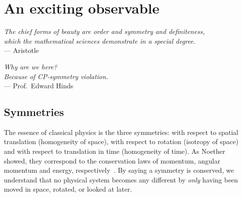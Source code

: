 \chapter{An exciting observable}
\label{ch:nedm-at-psi}




\begin{flushright}{\slshape    
  The chief forms of beauty are order and symmetry and definiteness,\\
  which the mathematical sciences demonstrate in a special degree.} \\ \medskip
--- Aristotle
\end{flushright}

\bigskip

\begin{flushright}{\slshape    
  Why are we here?\\
  Because of CP-symmetry violation.} \\ \medskip
--- Prof.\ Edward Hinds
\end{flushright}

\bigskip

\section{Symmetries}


The essence of classical physics is the three symmetries: with respect to spatial translation (homogeneity of space), with respect to rotation (isotropy of space) and with respect to translation in time (homogeneity of time). As Noether showed, they correspond to the conservation laws of momentum, angular momentum and energy, respectively~\cite{Noether1918}. By saying a symmetry is conserved, we understand that no physical system becomes any different by \emph{only} having been moved in space, rotated, or looked at later.

